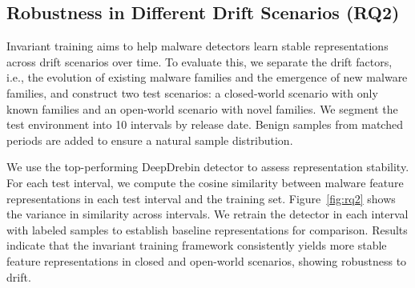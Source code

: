 
\subsection{Robustness in Different Drift Scenarios (RQ2)}
\label{rq2}
Invariant training aims to help malware detectors learn stable representations across drift scenarios over time. To evaluate this, we separate the drift factors, i.e., the evolution of existing malware families and the emergence of new malware families, and construct two test scenarios: a closed-world scenario with only known families and an open-world scenario with novel families. We segment the test environment into 10 intervals by release date. Benign samples from matched periods are added to ensure a natural sample distribution.


We use the top-performing DeepDrebin detector to assess representation stability. For each test interval, we compute the cosine similarity between malware feature representations in each test interval and the training set. Figure~\ref{fig:rq2} shows the variance in similarity across intervals. We retrain the detector in each interval with labeled samples to establish baseline representations for comparison. Results indicate that the invariant training framework consistently yields more stable feature representations in closed and open-world scenarios, showing robustness to drift.

\begin{center}
\end{center}







